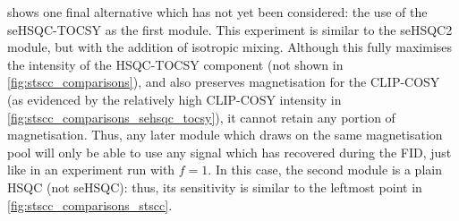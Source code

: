  shows one final alternative which has not yet been considered: the use of the seHSQC-TOCSY\autocite{Hansen2021AC} as the first module.
This experiment is similar to the seHSQC2 module, but with the addition of isotropic mixing.
Although this fully maximises the intensity of the HSQC-TOCSY component (not shown in \cref{fig:stscc_comparisons}), and also preserves  magnetisation for the CLIP-COSY (as evidenced by the relatively high CLIP-COSY intensity in \cref{fig:stscc_comparisons_sehsqc_tocsy}), it cannot retain any portion of  magnetisation.
Thus, any later module which draws on the same magnetisation pool will only be able to use any signal which has recovered during the FID, just like in an experiment run with $f = 1$.
In this case, the second module is a plain HSQC (not seHSQC): thus, its sensitivity is similar to the leftmost point in \cref{fig:stscc_comparisons_stscc}.
